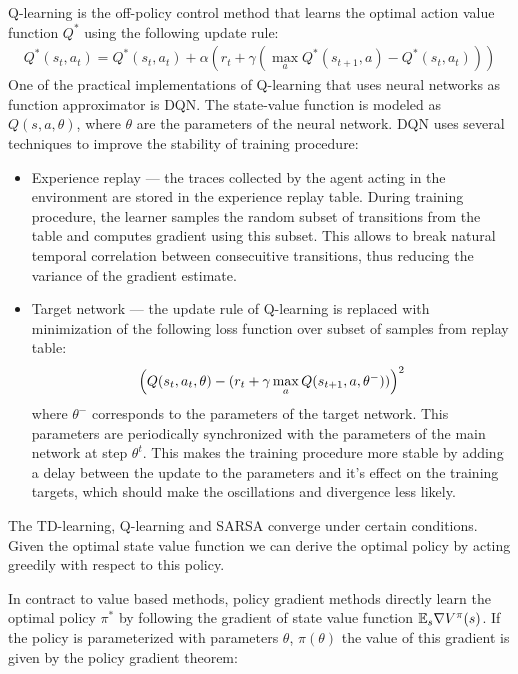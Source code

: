 Q-learning is the off-policy control method that learns the optimal action value 
function $Q^{*}$ using the following update rule:
\begin{align*}
    Q^{*}(s_t, a_t) = Q^{*}(s_t, a_t) + \alpha (r_t + \gamma (\max_{a} Q^{*}(s_{t + 1}, a) -
    Q^{*}(s_t, a_t)))
\end{align*}
One of the practical implementations of Q-learning that uses neural networks as function
approximator is DQN\cite{mnih-dqn-2015}. The state-value function is modeled as $Q(s,a,\theta)$,
where $\theta$ are the parameters of the neural network.
DQN uses several techniques to improve the stability of training procedure:
\begin{itemize}
    \item Experience replay --- the traces collected by the agent acting in the environment are
        stored in the experience replay table. During training procedure, the learner samples
        the random subset of transitions from the table and computes gradient using this subset.
        This allows to break natural temporal correlation between consecuitive transitions,
        thus reducing the variance of the gradient estimate.

    \item Target network --- the update rule of Q-learning is replaced with minimization of the
        following loss function over subset of samples from replay table:
        \begin{align*}
            \left( Q(s_t, a_t, \theta) - (r_t + \gamma \max_{a} Q(s_{t + 1}, a, \theta^{-})) \right)^2
        \end{align*}
        where $\theta^{-}$ corresponds to the parameters of the target network. This parameters are
        periodically synchronized with the parameters of the main network at step $\theta^t$. This
        makes the training procedure more stable by adding a delay between the update to the
        parameters and it's effect on the training targets, which should make the oscillations and
        divergence less likely.
\end{itemize}

The TD-learning, Q-learning and SARSA converge under certain conditions. Given the optimal state
value function we can derive the optimal policy by acting greedily with respect to this policy.

In contract to value based methods, policy gradient methods directly learn the optimal policy
$\pi^*$ by following the gradient of state value function $\mathbb{E}_s \nabla V^{\pi}(s)$.
If the policy is parameterized with parameters $\theta$, $\pi(\theta)$ the value of this
gradient is given by the policy gradient theorem:

